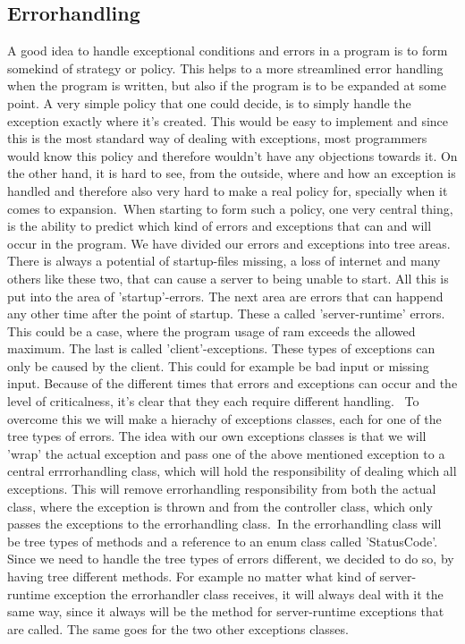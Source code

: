 \documentclass[a4paper,10pt,titlepage]{article}
\begin{document}
		\subsection{Errorhandling}
			A good idea to handle exceptional conditions and errors in a program is to form somekind of strategy or policy. This helps to a more streamlined error handling
			when the program is written, but also if the program is to be expanded at some point. A very simple policy that one could decide, is to
			simply handle the exception exactly where it's created. This would be easy to implement and since this is the most standard way of dealing with
			exceptions, most programmers would know this policy and therefore wouldn't have any objections towards it. On the other hand, it is hard to see, from
			the outside, where and how an exception is handled and therefore also very hard to make a real policy for, specially when it comes to expansion.\
			When starting to form such a policy, one very central thing, is the ability to predict which kind of errors and exceptions that can and will 
			occur in the program. We have divided our errors and exceptions into tree areas. There is always a potential of startup-files missing, a loss of internet and many others like these two, that can cause a server to being unable to start. All this is put into the area of 'startup'-errors. The next area are errors that can happend any other time after the point of startup. These a called 'server-runtime' errors. This could be a case, where the program usage of ram exceeds the allowed maximum. The last is called 'client'-exceptions. These types of exceptions can only be caused by the client. This could for example be bad input or missing input.  Because of the different times that errors and exceptions can occur and the level of criticalness, it's clear that they each require different handling. \
			To overcome this we will make a hierachy of exceptions classes, each for one of the tree types of errors. The idea with our own exceptions classes is that we will 'wrap' the actual exception and pass one of the above mentioned exception to a central errrorhandling class, which will hold the responsibility of dealing which all exceptions. This will remove errorhandling responsibility from both the actual class, where the exception is thrown and from the controller class, which only passes the exceptions to the errorhandling class.\
			In the errorhandling class will be tree types of methods and a reference to an enum class called 'StatusCode'. Since we need to handle the tree types of errors different, we decided to do so, by having tree different methods. For example no matter what kind of server-runtime exception the errorhandler class receives, it will always deal with it the same way, since it always will be the method for server-runtime exceptions that are called. The same goes for the two other exceptions classes.\
\end{document}

